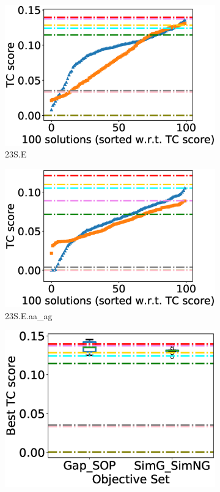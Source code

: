 \begin{figure}[!htbp]
\begin{adjustwidth}{-0.5cm}{-0.5cm}
\begin{subfigure}{0.25\textwidth}
			\includegraphics[width=\columnwidth]{Figure/summary/precomputedInit/23S.E/tc_density_single_run}
			\caption{23S.E}
\end{subfigure}    
		\begin{subfigure}{0.25\textwidth}
			\includegraphics[width=\columnwidth]{Figure/summary/precomputedInit/23S.E.aa_ag/tc_density_single_run}
			\caption{23S.E.aa\_ag}
\end{subfigure}
		\begin{subfigure}{0.25\textwidth}
			\includegraphics[width=\columnwidth]{Figure/summary/precomputedInit/23S.E/objset_tc_rank}

\end{subfigure}
\end{adjustwidth}
\end{figure}
